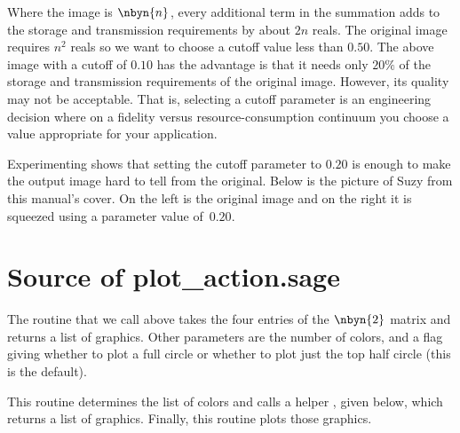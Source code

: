 Where the image is $\nbyn{n}$, every additional term in the summation
adds to the storage and transmission requirements by about $2n$ reals.
The original image requires $n^2$ reals so we want to choose a cutoff value 
less than $0.50$.
The above image with a cutoff of $0.10$ has the advantage is that it needs 
only $20\%$ of the storage
and transmission requirements of the original image.
However, its quality may not be acceptable.
That is, selecting a cutoff parameter is an engineering decision where
on a fidelity versus resource-consumption continuum 
you choose a value appropriate for your application.
 
Experimenting shows that setting
the cutoff parameter to $0.20$ is enough to make the output image hard to tell
from the original.
Below is the picture of Suzy 
from this manual's cover.
On the left is the original image
and on the right it is squeezed using a parameter value of~$0.20$.
\begin{center}
  \quad
\end{center}



\section{Source of plot\_action.sage}

The 
routine that we call above takes the four entries of the $\nbyn{2}$
matrix and returns a list of graphics.
Other parameters are the number of colors, and a flag giving whether
to plot a full circle or whether to plot just the top half circle (this
is the default).

This routine determines the list of colors and 
calls a helper , 
given below, which returns a list of graphics.
Finally, this routine plots those graphics.


